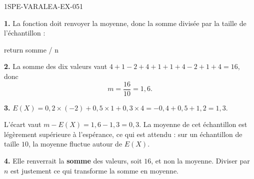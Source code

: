 \begin{corrige}{1SPE-VARALEA-EX-051}

\textbf{1.} La fonction doit renvoyer la moyenne, donc la somme divisée par la
taille de l'échantillon :

\begin{python}
    return somme / n
\end{python}

\medskip
\textbf{2.} La somme des dix valeurs vaut
$4+1-2+4+1+1+4-2+1+4 = 16$, donc
\[
m = \frac{16}{10} = 1{,}6.
\]

\medskip
\textbf{3.} $E(X) = 0{,}2 \times (-2) + 0{,}5 \times 1 + 0{,}3 \times 4
= -0{,}4 + 0{,}5 + 1{,}2 = 1{,}3$.

L'écart vaut $m - E(X) = 1{,}6 - 1{,}3 = 0{,}3$. La moyenne de cet échantillon
est légèrement supérieure à l'espérance, ce qui est attendu : sur un échantillon
de taille $10$, la moyenne fluctue autour de $E(X)$.

\medskip
\textbf{4.} Elle renverrait la \textbf{somme} des valeurs, soit $16$, et non la
moyenne. Diviser par $n$ est justement ce qui transforme la somme en moyenne.

\end{corrige}
